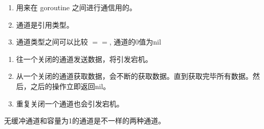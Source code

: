 \begin{enumerate}
\tightlist
\item
  用来在 goroutine 之间进行通信用的。
\item
  通道是引用类型。
\item
  通道类型之间可以比较 \(==\), 通道的0值为nil
\end{enumerate}

\begin{Shaded}
\begin{Highlighting}[]
\NormalTok{(} \NormalTok{)}
\end{Highlighting}
\end{Shaded}

\begin{enumerate}
\tightlist
\item
  往一个关闭的通道发送数据，将引发宕机。
\item
  从一个关闭的通道获取数据，会不断的获取数据。直到获取完毕所有数据。然后，之后的操作立即返回nil。
\item
  重复关闭一个通道也会引发宕机。
\end{enumerate}

\begin{Shaded}
\begin{Highlighting}[]
\NormalTok{(} \NormalTok{)     }
\NormalTok{(} \NormalTok{, }\NormalTok{)  }
\NormalTok{(} \NormalTok{, }\NormalTok{)  }
\NormalTok{(}\NormalTok{) }
\end{Highlighting}
\end{Shaded}

无缓冲通道和容量为1的通道是不一样的两种通道。

\begin{Shaded}
\begin{Highlighting}[]
\NormalTok{(} \NormalTok{, }\NormalTok{)  }
\NormalTok{) }
\NormalTok{(} \NormalTok{, }\NormalTok{)  }
 
\NormalTok{) }

\CommentTok{//}
\end{Highlighting}
\end{Shaded}

